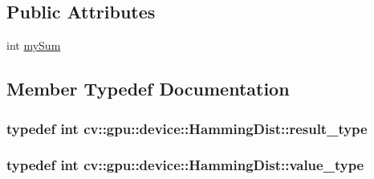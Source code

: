 \subsection*{Public Attributes}
\begin{DoxyCompactItemize}
\item 
int \hyperlink{structcv_1_1gpu_1_1device_1_1HammingDist_a4646f243ffd3f87ad62d27492687a5a6}{my\-Sum}
\end{DoxyCompactItemize}


\subsection{Member Typedef Documentation}
\hypertarget{structcv_1_1gpu_1_1device_1_1HammingDist_a2312271ebed1a0962f8506f87fa0dcf7}{
\subsubsection[{result\-\_\-type}]{\setlength{\rightskip}{0pt plus 5cm}typedef int {\bf cv\-::gpu\-::device\-::\-Hamming\-Dist\-::result\-\_\-type}}}\label{structcv_1_1gpu_1_1device_1_1HammingDist_a2312271ebed1a0962f8506f87fa0dcf7}
\hypertarget{structcv_1_1gpu_1_1device_1_1HammingDist_ad19a0e8b774ca3ff6a1f6b25c035906c}{
\subsubsection[{value\-\_\-type}]{\setlength{\rightskip}{0pt plus 5cm}typedef int {\bf cv\-::gpu\-::device\-::\-Hamming\-Dist\-::value\-\_\-type}}}\label{structcv_1_1gpu_1_1device_1_1HammingDist_ad19a0e8b774ca3ff6a1f6b25c035906c}


